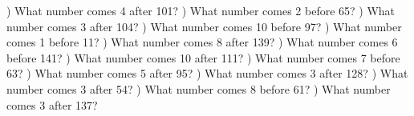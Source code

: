 \documentclass{article}%
\begin{document}
\newline%
\newline%
) What number comes 4 after 101?%
\newline%
\newline%
) What number comes 2 before 65?%
\newline%
\newline%
) What number comes 3 after 104?%
\newline%
\newline%
) What number comes 10 before 97?%
\newline%
\newline%
) What number comes 1 before 11?%
\newline%
\newline%
) What number comes 8 after 139?%
\newline%
\newline%
) What number comes 6 before 141?%
\newline%
\newline%
) What number comes 10 after 111?%
\newline%
\newline%
) What number comes 7 before 63?%
\newline%
\newline%
) What number comes 5 after 95?%
\newline%
\newline%
) What number comes 3 after 128?%
\newline%
\newline%
) What number comes 3 after 54?%
\newline%
\newline%
) What number comes 8 before 61?%
\newline%
\newline%
) What number comes 3 after 137?%
\end{document}
